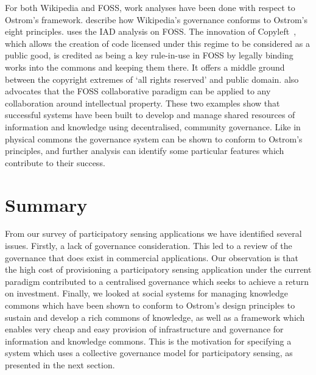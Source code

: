 For both Wikipedia and FOSS, work analyses have been done with respect to Ostrom's framework. 
 describe how Wikipedia's governance conforms to Ostrom's eight principles. 
 uses the \ac{IAD} analysis on FOSS. The innovation of Copyleft~\citep{Stallman1999}, which allows the creation of code licensed under this regime to be considered as a public good, is credited as being a key rule-in-use in FOSS by legally binding works into the commons and keeping them there. 
It offers a middle ground between the copyright extremes of `all rights reserved' and public domain. 
 also advocates that the FOSS collaborative paradigm can be applied to any collaboration around intellectual property. 
These two examples show that successful systems have been built to develop and manage shared resources of information and knowledge using decentralised, community governance. 
Like in physical commons the governance system can be shown to conform to Ostrom's principles, and further analysis can identify some particular features which contribute to their success.

\section{Summary}
From our survey of participatory sensing applications we have identified several issues.
Firstly, a lack of governance consideration. 
This led to a review of the governance that does exist in commercial applications. 
Our observation is that the high cost of provisioning a participatory sensing application under the current paradigm contributed to a centralised governance which seeks to achieve a return on investment. 
Finally, we looked at social systems for managing knowledge commons which have been shown to conform to Ostrom's design principles to sustain and develop a rich commons of knowledge, as well as a framework which enables very cheap and easy provision of infrastructure and governance for information and knowledge commons.
This is the motivation for specifying a system which uses a collective governance model for participatory sensing, as presented in the next section.


